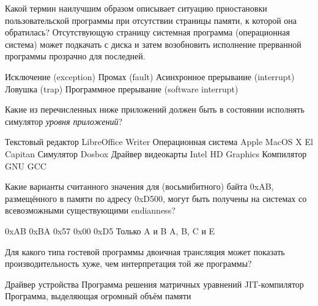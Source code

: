 \documentclass[a4paper, addpoints]{exam}
\begin{document}
\begin{questions}


\question[4] Какой термин наилучшим образом описывает ситуацию приостановки пользовательской программы при отсутствии страницы памяти, к которой она обратилась? Отсутствующую страницу системная программа (операционная система) может подкачать с диска и затем возобновить исполнение прерванной программы прозрачно для последней.
\begin{choices}
\choice Исключение (exception)
\correctchoice Промах (fault)
\choice Асинхронное прерывание (interrupt)
\choice Ловушка (trap)
\choice Программное прерывание (software interrupt)
\end{choices}


\question[4] Какие из перечисленных ниже приложений должен быть в состоянии исполнять симулятор \textit{уровня приложений}?
\begin{choices}
\correctchoice Текстовый редактор LibreOffice Writer
\choice Операционная система Apple MacOS X El Capitan
\correctchoice Симулятор Dosbox
\choice Драйвер видеокарты Intel HD Graphics
\correctchoice Компилятор GNU GCC
\end{choices}

\question[4] Какие варианты считанного значения для (восьмибитного) байта 0xAB, размещённого в памяти по адресу 0xD500, могут быть получены на системах со всевозможными существующими endianness?
\begin{choices}
\correctchoice 0xAB
\choice 0xBA
\choice 0x57
\choice 0x00
\choice 0xD5
\choice Только A и B
\choice A, B, C и E
\end{choices}

\question[4] Для какого типа гостевой программы двоичная трансляция может показать производительность хуже, чем интерпретация той же программы?
\begin{choices}
\choice Драйвер устройства
\choice Программа решения матричных уравнений
\correctchoice JIT-компилятор
\choice Программа, выделяющая огромный объём памяти
\end{choices}

\newpage
\phantom{Blank page}

\end{questions}
\end{document}
